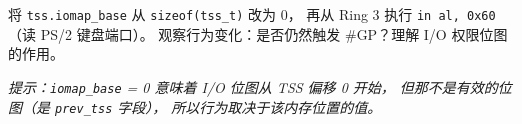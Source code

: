 \begin{exercise}[title={练习 3：\texttt{iomap\_base} 实验}]
将 \texttt{tss.iomap\_base} 从 \texttt{sizeof(tss\_t)} 改为 0，
再从 Ring 3 执行 \texttt{in al, 0x60}（读 PS/2 键盘端口）。
观察行为变化：是否仍然触发 \#GP？理解 I/O 权限位图的作用。

\emph{提示：\texttt{iomap\_base} = 0 意味着 I/O 位图从 TSS 偏移 0 开始，
但那不是有效的位图（是 \texttt{prev\_tss} 字段），
所以行为取决于该内存位置的值。}
\end{exercise}
